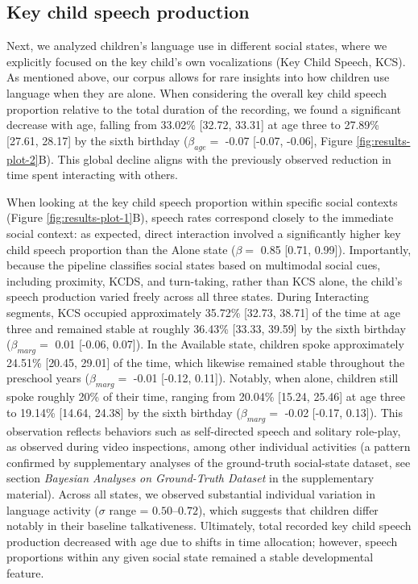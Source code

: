 \documentclass[
  english,
  12pt,
  man,floatsintext]{apa6}
\begin{document}
\subsection{Key child speech production}\label{key-child-speech-production}

Next, we analyzed children's language use in different social states, where we explicitly focused on the key child's own vocalizations (Key Child Speech, KCS). As mentioned above, our corpus allows for rare insights into how children use language when they are alone. When considering the overall key child speech proportion relative to the total duration of the recording, we found a significant decrease with age, falling from 33.02\% {[}32.72, 33.31{]} at age three to 27.89\% {[}27.61, 28.17{]} by the sixth birthday (\(\beta_{age} =\) -0.07 {[}-0.07, -0.06{]}, Figure \ref{fig:results-plot-2}B). This global decline aligns with the previously observed reduction in time spent interacting with others.

When looking at the key child speech proportion within specific social contexts (Figure \ref{fig:results-plot-1}B), speech rates correspond closely to the
immediate social context: as expected, direct interaction involved a significantly higher key child speech proportion than the Alone state (\(\beta =\) 0.85 {[}0.71, 0.99{]}). Importantly, because the pipeline classifies social states based on multimodal social cues, including proximity, KCDS, and turn-taking, rather than KCS alone, the child's speech production varied freely across all three states. During Interacting segments, KCS occupied approximately 35.72\% {[}32.73, 38.71{]} of the time at age three and remained stable at roughly 36.43\% {[}33.33, 39.59{]} by the sixth birthday (\(\beta_{marg} =\) 0.01 {[}-0.06, 0.07{]}). In the Available state, children spoke approximately 24.51\% {[}20.45, 29.01{]} of the time, which likewise remained stable throughout the preschool years (\(\beta_{marg} =\) -0.01 {[}-0.12, 0.11{]}). Notably, when alone, children still spoke roughly 20\% of their time, ranging from 20.04\% {[}15.24, 25.46{]} at age three to 19.14\% {[}14.64, 24.38{]} by the sixth birthday (\(\beta_{marg} =\) -0.02 {[}-0.17, 0.13{]}). This observation reflects behaviors such as self-directed speech and solitary role-play, as observed during video inspections, among other individual activities (a pattern confirmed by supplementary analyses of the ground-truth social-state dataset, see section \emph{Bayesian Analyses on Ground-Truth Dataset} in the supplementary material). Across all states, we observed substantial individual variation in language activity (\(\sigma\) range = \(0.50 \text{--} 0.72\)), which suggests that children differ notably in their baseline talkativeness. Ultimately, total recorded key child speech production decreased with age due to shifts in time allocation; however, speech proportions within any given social state remained a stable developmental feature.
\end{document}
